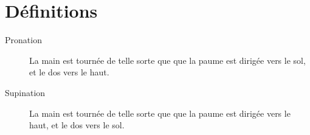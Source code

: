 \section{Définitions}


\begin{description}
	\item[Pronation] La main est tournée de telle sorte que que la paume est dirigée vers le sol, et le dos vers le haut.
	
	\item[Supination] La main est tournée de telle sorte que que la paume est dirigée vers le haut, et le dos vers le sol.
\end{description}

